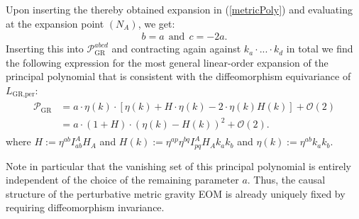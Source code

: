 Upon inserting the thereby obtained expansion in (\ref{metricPoly}) and evaluating at the expansion point $(N_A)$, we get:
\begin{align}
    b = a \ \ \text{and} \ \ c = -2a.
\end{align}
Inserting this into $\mathcal{P}_{\text{GR}}^{abcd}$ and contracting again against $k_a\cdot ...\cdot k_d$ in total we find the following expression for the most general linear-order expansion of the principal polynomial that is consistent with the diffeomorphism equivariance of $L_{\text{GR,per}}$:
\begin{align}
\begin{aligned}
    \mathcal{P}_{\text{GR}} &= a \cdot  \eta(k) \cdot \left [\eta(k) + H \cdot \eta(k)  -
    2 \cdot  \eta(k) H(k) \right ] + \mathcal{O}(2)\\
    &= a \cdot (1 + H) \cdot (\eta(k) - H(k))^2 + \mathcal{O}(2).
\end{aligned}
\end{align}
where  $H:=\eta^{ab} I^A_{ab} H_{A}$ and $H(k) := \eta^{ap} \eta^{bq} I_{pq}^A H_A k_a k_b$ and $\eta(k) := \eta^{ab}k_a k_b$. 
\begin{comment}
Taking a section $g \in \Gamma(F_{\text{GR}})$ and the corresponding inverse metric $g^{-1} \in \Gamma(F_{\text{GR}}^{\ast})$ with $(g^{-1})^{ab}=:g^{ab}$ and the usual relation $g^{ab}g_{bc}= \delta^a_c$ and evaluating the thus obtained most general expression for the principal polynomial we find
\begin{align}
    \mathcal{P}_{\text{GR,per}} (g_{ab}) = -a \cdot \operatorname{det}(g) g^{ab} g^{cd} k_ak_bk_ck_d + \mathcal{O}(2).
\end{align}
\end{comment}
Note in particular that the vanishing set of this principal polynomial is entirely independent of the choice of the remaining parameter $a$. Thus, the causal structure of the perturbative metric gravity EOM is already uniquely fixed by requiring diffeomorphism invariance.

